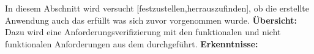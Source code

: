 %
In diesem Abschnitt wird versucht [festzustellen,herrauszufinden], ob die erstellte Anwendung auch das erfüllt was sich zuvor vorgenommen wurde.\newline%
%
\textbf{Übersicht:} %
Dazu wird eine Anforderungsverifizierung mit den funktionalen und nicht funktionalen Anforderungen aus dem  durchgeführt.\newline%
%
\textbf{Erkenntnisse:}\myTodo %



